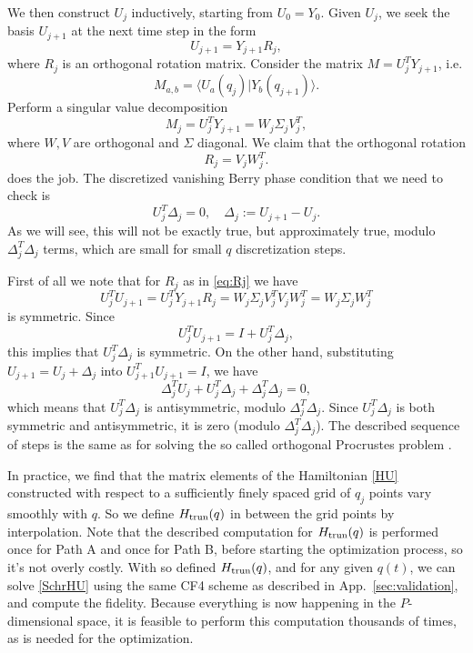 \documentclass[a4paper,12pt]{article}
\theoremstyle{remark}
\theoremstyle{theorem}
\begin{document}
We then construct $U_j$ inductively, starting from $U_0 = Y_0$. Given $U_j$,
we seek the basis $U_{j + 1}$ at the next time step in the form
\begin{equation}
	U_{j + 1} = Y_{j + 1} R_j,
\end{equation}
where $R_j$ is an orthogonal rotation matrix. Consider the matrix $M = U_j^T
Y_{j + 1}$, i.e.
\begin{equation}
	M_{a, b} = \langle U_a (q_j) |Y_b (q_{j + 1}) \rangle .
\end{equation}
Perform a singular value decomposition
\begin{equation}
	M_j = U_j^T Y_{j + 1} = W_j \Sigma_j V_j^T,
\end{equation}
where $W, V$ are orthogonal and $\Sigma$ diagonal. We claim that the
orthogonal rotation
\begin{equation}
	R_j = V_j W_j^T . \label{eq:Rj}
\end{equation}
does the job. The discretized vanishing Berry phase condition that we need to
check is
\begin{equation}
	U_j^T \Delta_j = 0, \quad \Delta_j := U_{j + 1} - U_j .
\end{equation}
As we will see, this will not be exactly true, but approximately true, modulo
$\Delta_j^T \Delta_j $ terms, which are small for small $q$ discretization
steps.

First of all we note that for $R_j$ as in \eqref{eq:Rj} we have
\begin{equation}
	U_j^T U_{j + 1} = U_j^T Y_{j + 1} R_j = W_j \Sigma_j V_j^T V_j W_j^T = W_j
	\Sigma_j W_j^T
\end{equation}
is symmetric. Since
\begin{equation}
	U_j^T U_{j + 1} = I + U_j^T \Delta_j,
\end{equation}
this implies that $U_j^T \Delta_j$ is symmetric. On the other hand,
substituting $U_{j + 1} = U_j + \Delta_j$ into $U_{j + 1}^T U_{j + 1} = I$, we
have
\begin{equation}
	\Delta_j^T U_j + U_j^T \Delta_j + \Delta_j^T \Delta_j = 0,
\end{equation}
which means that $U_j^T \Delta_j$ is antisymmetric, modulo $\Delta_j^T
\Delta_j $. Since $U_j^T \Delta_j$ is both symmetric and antisymmetric, it is
zero (modulo $\Delta_j^T \Delta_j $). The described sequence of steps is the same as
for solving the so called orthogonal Procrustes problem
{\cite{Schonemann1966,LiuVanderbilt2015}}.

In practice, we find that the matrix elements of the Hamiltonian \eqref{HU}
constructed with respect to a sufficiently finely spaced grid of $q_j$ points
vary smoothly with $q$. So we define $H_{\rm trun}
(q)$ in between the grid points by interpolation. Note that the described computation for $H_{\rm trun}
(q)$
is performed once for Path A and once for Path B, before starting the
optimization process, so it's not overly costly. With so defined
$H_{\rm trun} (q)$, and for any given $q (t)$, we
can solve \eqref{SchrHU} using the same CF4 scheme as described in App.~\ref{sec:validation}, and compute the fidelity. Because everything is now happening in the $P$-dimensional space, it is feasible to perform this computation thousands of times, as is needed for
the optimization.
\end{document}
